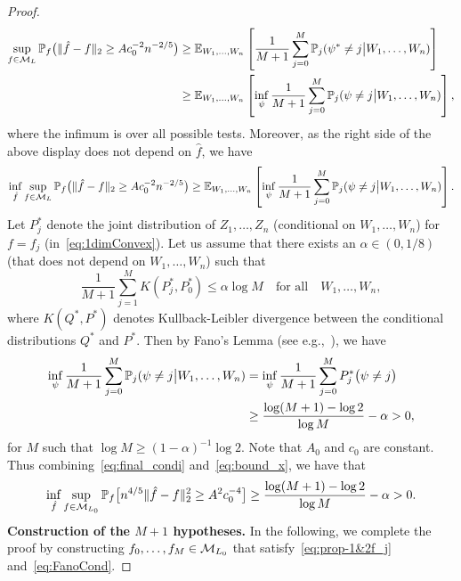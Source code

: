 \begin{proof}
\begin{align*}
\sup_{f \in \mathcal{M}_L} \mathbb{P}_f\big(\|\hat{f}-f\|_2 \ge A c_0^{-2} n^{-2/5}\big)
& \ge  \mathbb{E}_{W_1, \ldots, W_n} \left[\frac{1}{M+1}\sum_{j=0}^{M} \mathbb{P}_j (\psi^* \ne j\big\vert W_1, \ldots, W_n) \right] \\
& \ge  \mathbb{E}_{W_1, \ldots, W_n}  \left[\inf_{\psi} \frac{1}{M+1}\sum_{j=0}^{M} \mathbb{P}_j (\psi \ne j\big\vert W_1, \ldots, W_n) \right],
\end{align*}
where the infimum is over all possible tests. Moreover, as the right side of the above display does not depend on $\hat f$, we have
\begin{equation}\label{eq:final_condi}
\inf_{\hat f} \sup_{f \in \mathcal{M}_L} \mathbb{P}_f\big(\|\hat{f}-f\|_2 \ge A c_0^{-2} n^{-2/5}\big)\ge  \mathbb{E}_{W_1, \ldots, W_n}  \left[\inf_{\psi} \frac{1}{M+1}\sum_{j=0}^{M} \mathbb{P}_j (\psi \ne j\big\vert W_1, \ldots, W_n) \right].
\end{equation}
Let $P_j^*$ denote the  joint  distribution of $Z_1,\ldots, Z_n$  (conditional on $W_1, \ldots, W_n$) for $f= f_{j}$ (in~\eqref{eq:1dimConvex}). Let us assume that there exists an $\alpha \in (0, 1/8)$ (that does not depend on $W_1, \ldots, W_n$)  such that 
\begin{equation}\label{eq:FanoCond}
\frac{1}{M+1} \sum_{j=1}^{M}K(P^*_j, P^*_0) \le\alpha \log M\quad \text{for all}  \quad W_1,\ldots, W_n,
\end{equation}
 where $K(Q^{*}, P^*)$ denotes Kullback-Leibler divergence between the conditional distributions $Q^*$ and $P^*$.
 Then by Fano's Lemma (see e.g.,~\citet[Corollary 2.6]{MR2724359}), we have
 \begin{align}\label{eq:bound_x}
 \begin{split}
 \inf_{\psi} \frac{1}{M+1}\sum_{j=0}^{M} \mathbb{P}_j (\psi \ne j\big\vert W_1, \ldots, W_n)  &= \inf_\psi \frac{1}{M+1}\sum_{j=0}^{M}P_j^*\big(\psi \neq j\big) \\
 &\ge \frac{\log(M+1)-\log 2}{\log M} -\alpha > 0,
 \end{split}
 \end{align}
for $M$ such that $\log M \ge (1 - \alpha)^{-1}\log 2$. Note that $A_0$ and $c_0$ are constant. Thus combining~\eqref{eq:final_condi} and~\eqref{eq:bound_x}, we have that 
\[\inf_{\hat f} \sup_{f \in \mathcal{M}_{L_0}} \mathbb{P}_{f} \big[n^{4/5}\|\hat{f}-f\|_2^2 \ge A ^2 c_0^{-4}\big] \ge \frac{\log(M+1)-\log 2}{\log M} -\alpha > 0.\]
\textbf{Construction of the $M+1$ hypotheses.} In the following, we complete the proof by constructing $f_0, \ldots, f_M \in \mathcal{M}_{L_0}$ that satisfy~\eqref{eq:prop-1&2f_j} and~\eqref{eq:FanoCond}.

\end{proof}

